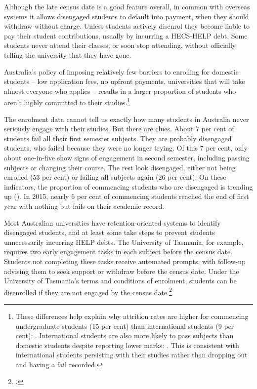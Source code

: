 Although the late census date is a good feature overall, in common with overseas systems it allows disengaged students to default into payment, when they should withdraw without charge. Unless students actively disenrol they become liable to pay their student contributions, usually by incurring a HECS-HELP debt. Some students never attend their classes, or soon stop attending, without officially telling the university that they have gone.

Australia's policy of imposing relatively few barriers to enrolling for domestic students -- low application fees, no upfront payments, universities that will take almost everyone who applies -- results in a larger proportion of students who aren't highly committed to their studies.\footnote{These differences help explain why attrition rates are higher for commencing undergraduate students (15 per cent) than international students (9 per cent): \textcite[][appendix~4]{DepartmentofEducationandTraining2017a}. International students are also more likely to pass subjects than domestic students despite reporting lower marks: \textcite[][75--76]{Norton2016c}. This is consistent with international students persisting with their studies rather than dropping out and having a fail recorded.}

The enrolment data cannot tell us exactly how many students in Australia never seriously engage with their studies. But there are clues. About 7 per cent of students fail all their first semester subjects. They are probably disengaged students, who failed because they were no longer trying. Of this 7 per cent, only about one-in-five show signs of engagement in second semester, including passing subjects or changing their course. The rest look disengaged, either not being enrolled (53 per cent) or failing all subjects again (26 per cent). On these indicators, the proportion of commencing students who are disengaged is trending up (). In 2015, nearly 6 per cent of commencing students reached the end of first year with nothing but fails on their academic record.

Most Australian universities have retention-oriented systems to identify disengaged students, and at least some take steps to prevent students unnecessarily incurring HELP debts. The University of Tasmania, for example, requires two early engagement tasks in each subject before the census date. Students not completing these tasks receive automated prompts, with follow-up advising them to seek support or withdraw before the census date. Under the University of Tasmania's terms and conditions of enrolment, students can be disenrolled if they are not engaged by the census date.\footcites[][]{Brown2017}[][]{UniversityofTasmania2018a}

